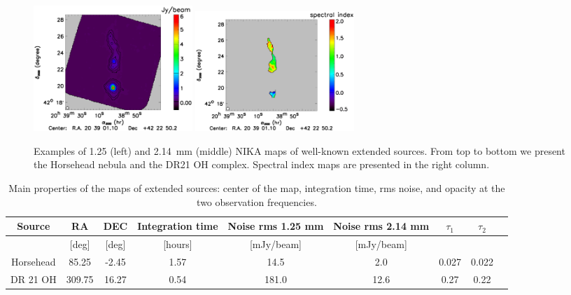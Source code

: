 \begin{figure}[t!]
\begin{center}
\includegraphics[width=6cm]{figures/DR21OH_2mm.ps}
\includegraphics[width=6cm]{figures/DR21OH_spectrum_map.ps}
\end{center}
  \caption{Examples of 1.25 (left) and 2.14~mm (middle) NIKA maps of well-known extended sources. From top to bottom we present
the Horsehead nebula and the DR21 OH complex. 
Spectral index maps are presented in the right column.}
\label{fig:extended_sources}
   \end{figure} 
 
 \begin{table}
\begin{center}
\begin{tabular}{ccccccccc}
\hline
\hline
Source & RA & DEC  & Integration time   & Noise rms 1.25 mm   &  Noise rms 2.14 mm   & $\tau_{1}$ & $\tau_{2}$ \\
\hline
&  [deg] & [deg] &  [hours] &   [mJy/beam]  &   [mJy/beam]  &  & \\
\hline
Horsehead  &  85.25     &    -2.45  &   1.57 & 14.5  &  2.0   &   0.027 &   0.022 \\
DR 21 OH     &  309.75   &   16.27 &   0.54 & 181.0& 12.6 & 0.27 &  0.22 \\
\hline \hline
\end{tabular}
\end{center}
\caption{Main properties of the maps of extended sources: center of the map, integration time, rms noise, and opacity
at the two observation frequencies.}
\label{tab:extended_sources}
\end{table}



